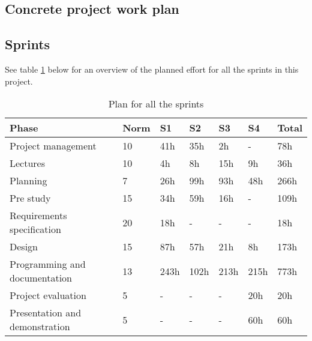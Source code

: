 

\subsection{Concrete project work plan}

\subsection*{Sprints}
See table \ref{tab:allsprints} below for an overview of the planned effort for all the sprints in this project.
\begin{table}[h!]
\begin{center}
\begin{tabular}{l|l|l|l|l|l|l} \hline
\textbf{Phase} &  \textbf{Norm} & \textbf{S1} & \textbf{S2}  & \textbf{S3} & \textbf{S4} & \textbf{Total} \\ \hline \hline
Project management & 10 & 41h & 35h & 2h & - & 78h\\
Lectures & 10 & 4h & 8h & 15h & 9h & 36h\\
Planning & 7 & 26h & 99h & 93h & 48h & 266h\\
Pre study & 15 & 34h & 59h & 16h & - & 109h\\
Requirements specification & 20 & 18h & - & - & - & 18h\\
Design & 15 & 87h & 57h & 21h & 8h & 173h\\
Programming and documentation & 13 & 243h & 102h & 213h & 215h & 773h\\
Project evaluation & 5 & - & - & - & 20h & 20h\\
Presentation and demonstration & 5 & - & - & - & 60h & 60h\\ \hline
\end{tabular}
\end{center}
\caption{Plan for all the sprints} \label{tab:allsprints}
\end{table}


